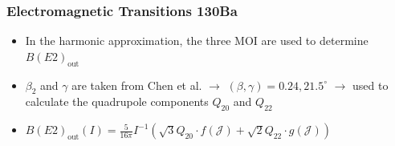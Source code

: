 \documentclass{beamer}
\begin{document}
\begin{frame}
  \frametitle{Electromagnetic Transitions 130Ba}

\begin{itemize}
  \item In the harmonic approximation, the three MOI are used to determine $B(E2)_\text{out}$
  \item $\beta_2$ and $\gamma$ are taken from Chen et al. $\rightarrow$ $(\beta,\gamma)=0.24,21.5^\circ$ $\rightarrow$ used to calculate the quadrupole components $Q_20$ and $Q_22$
  \item $B(E2)_\text{out}(I)=\frac{5}{16\pi}I^{-1}\left(\sqrt{3}Q_{20}\cdot f(\mathcal{J})+\sqrt{2}Q_{22}\cdot g(\mathcal{J})\right)$
\end{itemize}
\begin{columns}
\begin{column}{0.3\textwidth}
  \begin{table}
    \centering
\end{table}
\end{column}
\end{columns}
\end{frame}
\end{document}
